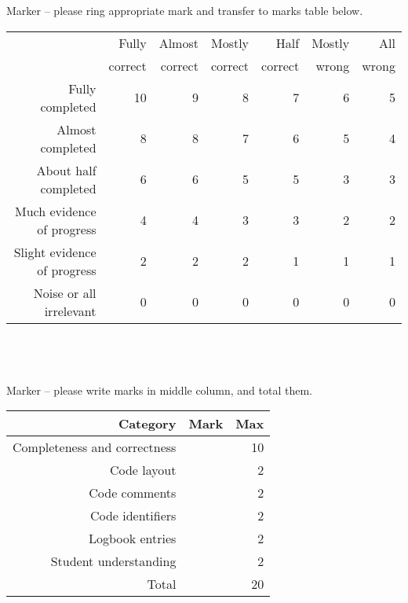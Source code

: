 \parbox{\textwidth}{
 \\
 \\
Marker -- please ring appropriate mark and transfer to marks table below. \\

\begin{tabular}{||r||r|r|r|r|r|r||} \hline \hline
                            & Fully   & Almost  & Mostly  & Half    & Mostly & All   \\
                            & correct & correct & correct & correct & wrong  & wrong \\ \hline
\hline
Fully completed             &      10 &         9 &     8 &       7 &      6 &     5 \\ \hline
Almost completed            &       8 &         8 &     7 &       6 &      5 &     4 \\ \hline
About half completed        &       6 &         6 &     5 &       5 &      3 &     3 \\ \hline
Much evidence of progress   &       4 &         4 &     3 &       3 &      2 &     2 \\ \hline
Slight evidence of progress &       2 &         2 &     2 &       1 &      1 &     1 \\ \hline
Noise or all irrelevant     &       0 &         0 &     0 &       0 &      0 &     0 \\ \hline
\hline 
\end{tabular} \\ \\

 \\
Marker -- please write marks in middle column, and total them. \\


\begin{tabular}{||r|r|r||} \hline \hline
Category                     & Mark & Max \\ \hline
\hline
Completeness and correctness &      & 10 \\ \hline
Code layout                  &      &  2 \\ \hline
Code comments                &      &  2 \\ \hline
Code identifiers             &      &  2 \\ \hline
Logbook entries              &      &  2 \\ \hline
Student understanding        &      &  2 \\ \hline
\hline
Total                        &      & 20 \\ \hline
\hline
\end{tabular} \\ \\

}
